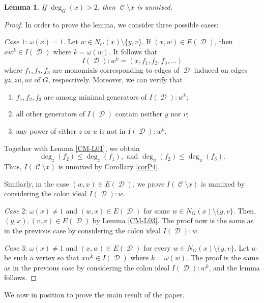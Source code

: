 \documentclass[12pt, amscd]{amsart}
\newtheorem{lem}[thm]{Lemma}
\theoremstyle{definition}
\DeclareMathOperator{\D}{\mathcal{D}}
\DeclareMathOperator{\C}{\mathcal{C}}
\newcommand{\0}{\bold{0}}
\begin{document}
\begin{lem}\label{CM-L05} If $\deg_G(x) > 2$, then $\C\setminus x$ is unmixed.
\end{lem}
\begin{proof} In order to prove the lemma, we consider three possible cases:

\medskip

{\it Case $1$}: $\omega(x)=1$. Let $w\in N_G(x)\setminus \{y,v\}$. If $(x,w)\in E(\D)$, then $xw^k\in I(\D)$ where $k = \omega(w)$. It follows that
$$I(\D) \colon w^k = (x, f_1,f_2,f_3, \ldots)$$
where $f_1,f_2,f_3$ are monomials corresponding to edges of $\D$ induced on edges $yz,zu,uv$ of $G$, respectively. Moreover, we can verify that
\begin{enumerate}
\item $f_1,f_2,f_3$ are among minimal generators of $I(\D) \colon w^k$;
\item all other generators of $I(\D)$ contain neither $y$ nor $v$;
\item any power of either $z$ or $u$ is not in $I(\D)\colon w^k$.
\end{enumerate}
Together with Lemma \ref{CM-L01}, we obtain
$$\deg_z(f_2)\leqslant \deg_z(f_1), \text{ and } \deg_u(f_2) \leqslant \deg_u(f_3).$$
Thus, $I(\C\setminus x)$ is unmixed by Corollary \ref{corP4}.

Similarly, in the case $(w,x)\in E(\D)$, we prove $I(\C\setminus x)$ is unmixed by considering the colon ideal $I(\D)\colon w$.
\medskip

{\it Case $2$}: $\omega(x) \ne 1$ and $(w,x)\in E(\D)$ for some $w\in N_G(x)\setminus\{y,v\}$. Then, $(y,x), (v,x)\in E(\D)$ by Lemma \ref{CM-L03}. The proof now is the same as in the previous case by considering the colon ideal $I(\D) \colon w$.

\medskip

{\it Case $3$}: $\omega(x)\ne 1$ and $(x,w)\in E(\D)$ for every $w\in N_G(x)\setminus\{y,v\}$. Let $w$ be such a vertex so that $xw^k\in I(\D)$ where $k=\omega(w)$. The proof is the same as in the previous case by considering the colon ideal $I(\D) \colon w^k$, and the lemma follows.
\end{proof}

We now in position to prove the main result of the paper.
\end{document}
